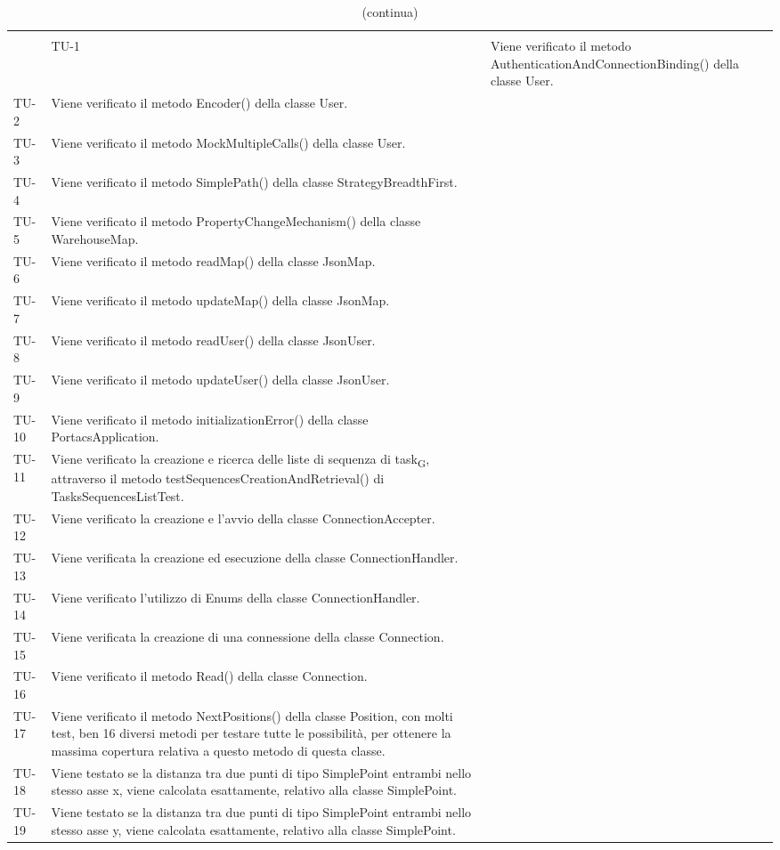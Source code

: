 \begin{longtable}{ >{\centering}p{} >{}p{}}


	\caption{Riepilogo Test di Unità}\\
	\hline
	\rowcolorhead
	 & \headertitle{Descrizione}
	\endfirsthead
	\caption[]{(continua)}\\
	\rowcolorhead
	 & \headertitle{Descrizione}
	\endhead

	TU-1 & Viene verificato il metodo AuthenticationAndConnectionBinding() della classe User.\tabularnewline
	TU-2 & Viene verificato il metodo Encoder() della classe User.\tabularnewline
	TU-3 & Viene verificato il metodo MockMultipleCalls() della classe User.\tabularnewline
	TU-4 & Viene verificato il metodo SimplePath() della classe StrategyBreadthFirst.\tabularnewline
	TU-5 & Viene verificato il metodo PropertyChangeMechanism() della classe WarehouseMap. \tabularnewline
	TU-6 & Viene verificato il metodo readMap() della classe JsonMap. \tabularnewline
	TU-7 & Viene verificato il metodo updateMap() della classe JsonMap. \tabularnewline
	TU-8 & Viene verificato il metodo readUser() della classe JsonUser. \tabularnewline
	TU-9 & Viene verificato il metodo updateUser() della classe JsonUser. \tabularnewline
	TU-10 & Viene verificato il metodo initializationError() della classe PortacsApplication. \tabularnewline
	TU-11 & Viene verificato la creazione e ricerca delle liste di sequenza di task\textsubscript{G}, attraverso il metodo testSequencesCreationAndRetrieval() di TasksSequencesListTest. \tabularnewline
	TU-12 & Viene verificato la creazione e l'avvio della classe ConnectionAccepter. \tabularnewline
	TU-13 & Viene verificata la creazione ed esecuzione della classe ConnectionHandler. \tabularnewline
	TU-14 & Viene verificato l'utilizzo di Enums della classe ConnectionHandler. \tabularnewline
	TU-15 & Viene verificata la creazione di una connessione della classe Connection. \tabularnewline
	TU-16 & Viene verificato il metodo Read() della classe Connection. \tabularnewline
	TU-17 & Viene verificato il metodo NextPositions() della classe Position, con molti test, ben 16 diversi metodi per testare tutte le possibilità, per ottenere la massima copertura relativa a questo metodo di questa classe. \tabularnewline
	TU-18 & Viene testato se la distanza tra due punti di tipo SimplePoint entrambi nello stesso asse x, viene calcolata esattamente, relativo alla classe SimplePoint. \tabularnewline
	TU-19 & Viene testato se la distanza tra due punti di tipo SimplePoint entrambi nello stesso asse y, viene calcolata esattamente, relativo alla classe SimplePoint. \tabularnewline

\end{longtable}
